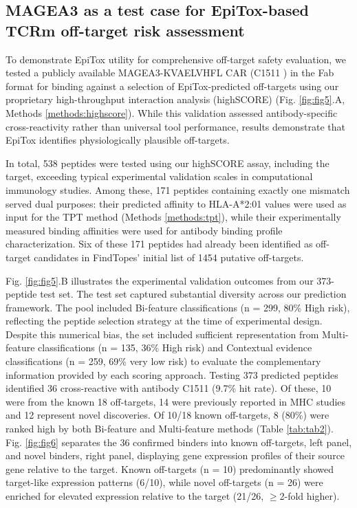 \documentclass[times, twoside, watermark]{zHenriquesLab-StyleBioRxiv}
\begin{document}
        \subsection*{MAGEA3 as a test case for EpiTox-based TCRm off-target risk assessment}\label{results:validation} 
            To demonstrate EpiTox utility for comprehensive off-target safety evaluation, we tested a publicly available MAGEA3-KVAELVHFL CAR (C1511 \cite{WO2021173674A1}) in the Fab format for binding against a selection of EpiTox-predicted off-targets using our proprietary high-throughput interaction analysis (highSCORE) (Fig. \ref{fig:fig5}.A, Methods \ref{methods:highscore}). While this validation assessed antibody-specific cross-reactivity rather than universal tool performance, results demonstrate that EpiTox identifies physiologically plausible off-targets.
            
            In total, 538 peptides were tested using our highSCORE assay, including the target, exceeding typical experimental validation scales in computational immunology studies. Among these, 171 peptides containing exactly one mismatch served dual purposes: their predicted affinity to HLA-A*2:01 values were used as input for the TPT method (Methods \ref{methods:tpt}), while their experimentally measured binding affinities were used for antibody binding profile characterization. Six of these 171 peptides had already been identified as off-target candidates in FindTopes' initial list of 1454 putative off-targets.
            
            Fig. \ref{fig:fig5}.B illustrates the experimental validation outcomes from our 373-peptide test set. The test set captured substantial diversity across our prediction framework. The pool included Bi-feature classifications (n = 299, 80\% High risk), reflecting the peptide selection strategy at the time of experimental design. Despite this numerical bias, the set included sufficient representation from Multi-feature classifications (n = 135, 36\% High risk) and Contextual evidence classifications (n = 259, 69\% very low risk) to evaluate the complementary information provided by each scoring approach. 
            Testing 373 predicted peptides identified 36 cross-reactive with antibody C1511 (9.7\% hit rate). Of these, 10 were from the known 18 off-targets, 14 were previously reported in MHC studies and 12 represent novel discoveries. Of 10/18 known off-targets, 8 (80\%) were ranked high by both Bi-feature and Multi-feature methods (Table \ref{tab:tab2}). 
            Fig. \ref{fig:fig6} separates the 36 confirmed binders into known off-targets, left panel, and novel binders, right panel, displaying gene expression profiles of their source gene relative to the target. Known off-targets (n = 10) predominantly showed target-like expression patterns (6/10), while novel off-targets (n = 26) were enriched for elevated expression relative to the target (21/26, $\geq$2-fold higher).
\end{document}
